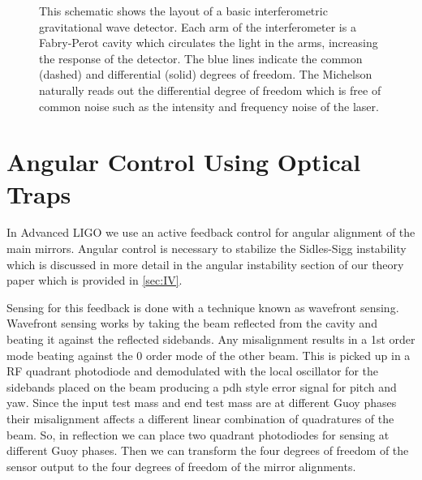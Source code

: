 \begin{figure}[htb]
\centering
{}
\caption[LIGO Schematic]{This schematic shows the layout of a basic
    interferometric gravitational wave detector.
    Each arm of the interferometer is a Fabry-Perot cavity which circulates
    the light in the arms, increasing the response of the detector.
    The blue lines indicate the common (dashed) and differential (solid)
    degrees of freedom.
    The Michelson naturally reads out the differential degree of freedom which
    is free of common noise such as the intensity and frequency noise of the
    laser.
    }
\label{fig:ligoschematic}
\end{figure}



\section{Angular Control Using Optical Traps}

In Advanced LIGO we use an active feedback control for angular alignment of
the main mirrors.
Angular control is necessary to stabilize the Sidles-Sigg instability
\cite{2006PhLA..354..167S}
which is discussed in more detail in the angular instability section of our
theory paper which is provided in \ref{sec:IV}.

Sensing for this feedback is done with a technique known as wavefront sensing.
Wavefront sensing works by taking the beam reflected from the cavity and
beating it against the reflected sidebands.
Any misalignment results in a 1st order mode beating against the 0 order mode
of the other beam.
This is picked up in a RF quadrant photodiode and demodulated with the local
oscillator for the sidebands placed on the beam producing a \ac{pdh}
style error signal for pitch and yaw.
Since the input test mass and end test mass are at different Guoy phases
their misalignment affects a different linear combination of quadratures of the
beam.
So, in reflection we can place two quadrant photodiodes for sensing at
different Guoy phases.
Then we can transform the four degrees of freedom of the sensor output to the
four degrees of freedom of the mirror alignments.

